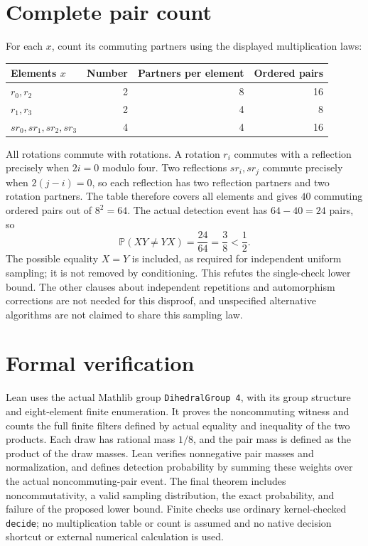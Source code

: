 \documentclass[10pt,a4paper]{article}
\begin{document}
\section*{Complete pair count}
For each $x$, count its commuting partners using the displayed
multiplication laws:
\begin{center}
\begin{tabular}{lrrr}
\toprule
Elements $x$ & Number & Partners per element & Ordered pairs\\
\midrule
$r_0,r_2$ & 2 & 8 & 16\\
$r_1,r_3$ & 2 & 4 & 8\\
$sr_0,sr_1,sr_2,sr_3$ & 4 & 4 & 16\\
\bottomrule
\end{tabular}
\end{center}
All rotations commute with rotations. A rotation $r_i$ commutes with
a reflection precisely when $2i=0$ modulo four.
Two reflections $sr_i,sr_j$ commute precisely when $2(j-i)=0$,
so each reflection has two reflection partners and two rotation partners.
The table therefore covers all elements and gives $40$ commuting
ordered pairs out of $8^2=64$.
The actual detection event has $64-40=24$ pairs, so
\[
\mathbb P(XY\ne YX)=\frac{24}{64}=\frac38<\frac12.
\]
The possible equality $X=Y$ is included, as required for independent
uniform sampling; it is not removed by conditioning.
This refutes the single-check lower bound. The other clauses about
independent repetitions and automorphism corrections are not needed
for this disproof, and unspecified alternative algorithms are not claimed
to share this sampling law.

\section*{Formal verification}
Lean uses the actual Mathlib group \texttt{DihedralGroup 4}, with its
group structure and eight-element finite enumeration. It proves the
noncommuting witness and counts the full finite filters defined by
actual equality and inequality of the two products.
Each draw has rational mass $1/8$, and the pair mass is defined as
the product of the draw masses. Lean verifies nonnegative pair masses
and normalization, and defines detection probability by summing these
weights over the actual noncommuting-pair event.
The final theorem includes noncommutativity, a valid sampling
distribution, the exact probability, and failure of the proposed lower bound.
Finite checks use ordinary kernel-checked \texttt{decide};
no multiplication table or count is assumed and no native decision
shortcut or external numerical calculation is used.
\end{document}
